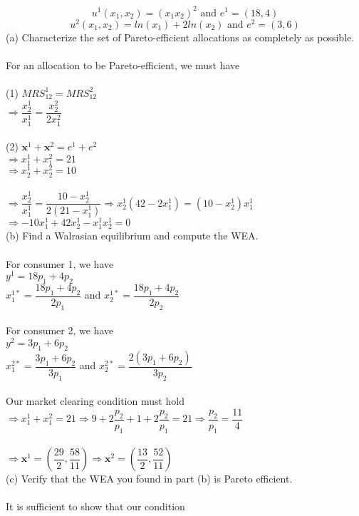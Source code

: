 \documentclass{article}
\begin{document}
\begin{itemize}
    $$u^1(x_1,x_2)=(x_1x_2)^2\text{ and }e^1=(18,4)$$
    $$u^2(x_1,x_2)=ln(x_1)+2ln(x_2)\text{ and }e^2=(3,6)$$
    (a) Characterize the set of Pareto-efficient allocations as completely as possible.\\\\
    For an allocation to be Pareto-efficient, we must have\\\\  
    (1) $MRS_{12}^1=MRS_{12}^2$\\
    $\Rightarrow\dfrac{x_2^1}{x_1^1}=\dfrac{x_2^2}{2x_1^2}$\\\\
    (2) $\textbf{x}^1+\textbf{x}^2=e^1+e^2$\\
    $\Rightarrow x_1^1+x_1^2=21$\\
    $\Rightarrow x_2^1+x_2^2=10$\\\\
    $\Rightarrow\dfrac{x_2^1}{x_1^1}=\dfrac{10-x_2^1}{2(21-x_1^1)}\Rightarrow x_2^1(42-2x_1^1)=(10-x_2^1)x_1^1$\\
    $\Rightarrow-10x_1^1+42x_2^1-x_1^1x_2^1=0$\\
    (b) Find a Walrasian equilibrium and compute the WEA.\\\\
    For consumer 1, we have\\
    $y^1=18p_1+4p_2$\\
    $x_1^{1*}=\dfrac{18p_1+4p_2}{2p_1}$ and $x_2^{1*}=\dfrac{18p_1+4p_2}{2p_2}$\\\\
    For consumer 2, we have\\
    $y^2=3p_1+6p_2$\\
    $x_1^{2*}=\dfrac{3p_1+6p_2}{3p_1}$ and $x_2^{2*}=\dfrac{2(3p_1+6p_2)}{3p_2}$\\\\
    Our market clearing condition must hold\\
    $\Rightarrow x_1^1+x_1^2=21\Rightarrow 9+2\dfrac{p_2}{p_1}+1+2\dfrac{p_2}{p_1}=21\Rightarrow\dfrac{p_2}{p_1}=\dfrac{11}{4}$\\\\
    $\Rightarrow\textbf{x}^1=(\dfrac{29}{2},\dfrac{58}{11})\Rightarrow\textbf{x}^2=(\dfrac{13}{2},\dfrac{52}{11})$\\
    (c) Verify that the WEA you found in part (b) is Pareto efficient.\\\\
    It is sufficient to show that our condition\\

\end{itemize}
\end{document}
